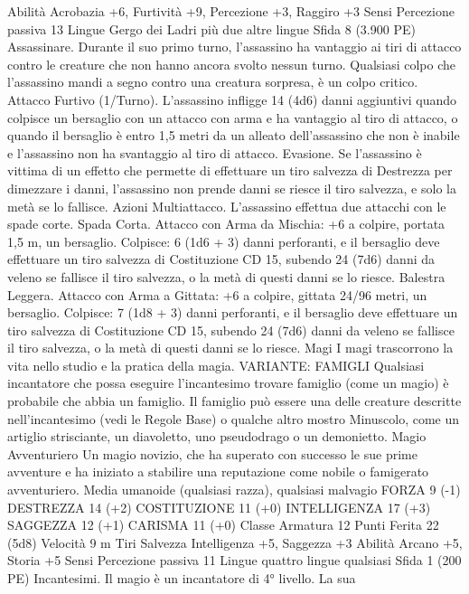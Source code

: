 \begin{multicols}{2}
Abilità Acrobazia +6, Furtività +9, Percezione +3, Raggiro +3
Sensi Percezione passiva 13
Lingue Gergo dei Ladri più due altre lingue
Sfida 8 (3.900 PE)
Assassinare. Durante il suo primo turno, l’assassino ha
vantaggio ai tiri di attacco contro le creature che non hanno
ancora svolto nessun turno. Qualsiasi colpo che l’assassino
mandi a segno contro una creatura sorpresa, è un colpo critico.
Attacco Furtivo (1/Turno). L’assassino infligge 14 (4d6) danni
aggiuntivi quando colpisce un bersaglio con un attacco con arma
e ha vantaggio al tiro di attacco, o quando il bersaglio è entro 1,5
metri da un alleato dell’assassino che non è inabile e l’assassino
non ha svantaggio al tiro di attacco.
Evasione. Se l’assassino è vittima di un effetto che permette di
effettuare un tiro salvezza di Destrezza per dimezzare i danni,
l’assassino non prende danni se riesce il tiro salvezza, e solo la
metà se lo fallisce.
Azioni
Multiattacco. L’assassino effettua due attacchi con le spade corte.
Spada Corta. Attacco con Arma da Mischia: +6 a colpire, portata
1,5 m, un bersaglio.
Colpisce: 6 (1d6 + 3) danni perforanti, e il bersaglio deve effettuare un
tiro salvezza di Costituzione CD 15, subendo 24 (7d6) danni da veleno se
fallisce il tiro salvezza, o la metà di questi danni se lo riesce.
Balestra Leggera. Attacco con Arma a Gittata: +6 a colpire,
gittata 24/96 metri, un bersaglio.
Colpisce: 7 (1d8 + 3) danni perforanti, e il bersaglio deve effettuare un
tiro salvezza di Costituzione CD 15, subendo 24 (7d6) danni da veleno se
fallisce il tiro salvezza, o la metà di questi danni se lo riesce.
Magi
I magi trascorrono la vita nello studio e la pratica della
magia.
VARIANTE: FAMIGLI
Qualsiasi incantatore che possa eseguire l’incantesimo trovare
famiglio (come un magio) è probabile che abbia un famiglio. Il
famiglio può essere una delle creature descritte nell’incantesimo
(vedi le Regole Base) o qualche altro mostro Minuscolo, come
un artiglio strisciante, un diavoletto, uno pseudodrago o un
demonietto.
Magio Avventuriero
Un magio novizio, che ha superato con successo le sue
prime avventure e ha iniziato a stabilire una
reputazione come nobile o famigerato avventuriero.
Media umanoide (qualsiasi razza), qualsiasi malvagio
FORZA 9 (-1)
DESTREZZA 14 (+2)
COSTITUZIONE 11 (+0)
INTELLIGENZA 17 (+3)
SAGGEZZA 12 (+1)
CARISMA 11 (+0)
Classe Armatura 12
Punti Ferita 22 (5d8)
Velocità 9 m
Tiri Salvezza Intelligenza +5, Saggezza +3
Abilità Arcano +5, Storia +5
Sensi Percezione passiva 11
Lingue quattro lingue qualsiasi
Sfida 1 (200 PE)
Incantesimi. Il magio è un incantatore di 4° livello. La sua

\end{multicols}
